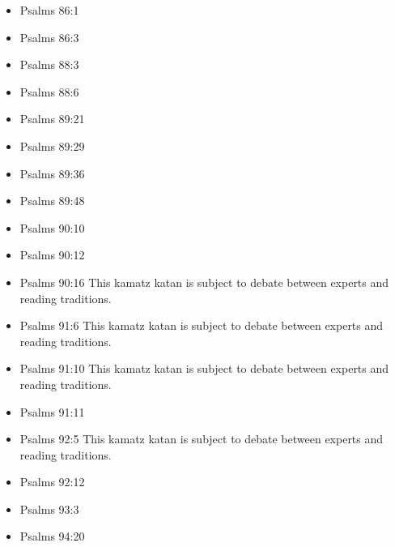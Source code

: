 \documentclass[14pt]{book}
\begin{document}
\begin{multicols}{2}
\begin{itemize}
					\item Psalms 86:1
					
					\item Psalms 86:3
			
			\item Psalms 88:3
			
			\item Psalms 88:6
			
			\item Psalms 89:21
			
			\item Psalms 89:29
					
					\item Psalms 89:36
					
					\item Psalms 89:48
					
					\item Psalms 90:10
					
					\item Psalms 90:12
					
					\item Psalms 90:16 This kamatz katan is subject to debate between experts and reading traditions.
					
					\item Psalms 91:6 This kamatz katan is subject to debate between experts and reading traditions.
					
					\item Psalms 91:10 This kamatz katan is subject to debate between experts and reading traditions.
					
					\item Psalms 91:11
					
					\item Psalms 92:5 This kamatz katan is subject to debate between experts and reading traditions.
					
					\item Psalms 92:12
					
					\item Psalms 93:3
					
					\item Psalms 94:20
					

\end{itemize}
\end{multicols}
\end{document}

